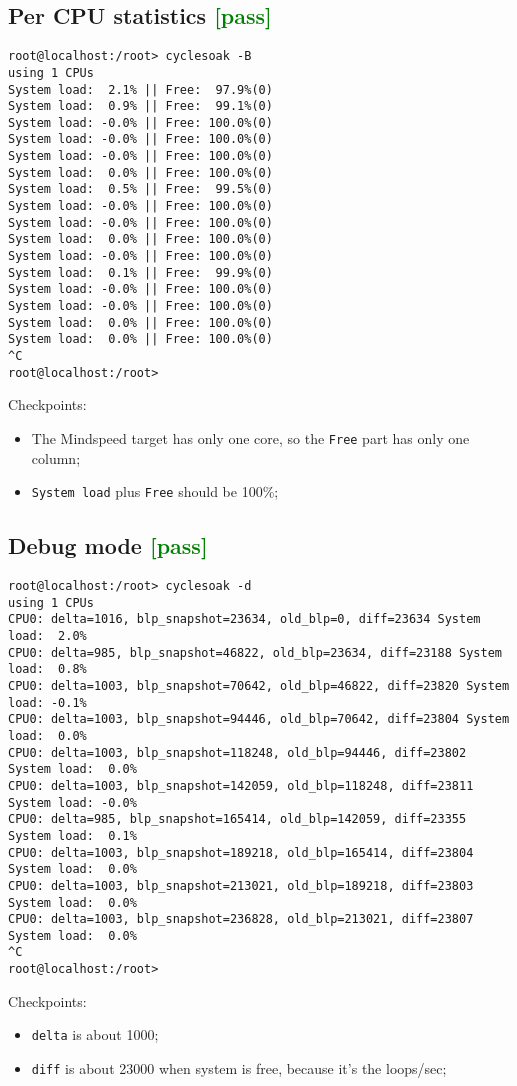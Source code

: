 \documentclass[a4paper]{report}
\begin{document}
\subsection{Per CPU statistics \textcolor{green}{[pass]}}
\begin{lstlisting}
root@localhost:/root> cyclesoak -B
using 1 CPUs
System load:  2.1% || Free:  97.9%(0)
System load:  0.9% || Free:  99.1%(0)
System load: -0.0% || Free: 100.0%(0)
System load: -0.0% || Free: 100.0%(0)
System load: -0.0% || Free: 100.0%(0)
System load:  0.0% || Free: 100.0%(0)
System load:  0.5% || Free:  99.5%(0)
System load: -0.0% || Free: 100.0%(0)
System load: -0.0% || Free: 100.0%(0)
System load:  0.0% || Free: 100.0%(0)
System load: -0.0% || Free: 100.0%(0)
System load:  0.1% || Free:  99.9%(0)
System load: -0.0% || Free: 100.0%(0)
System load: -0.0% || Free: 100.0%(0)
System load:  0.0% || Free: 100.0%(0)
System load:  0.0% || Free: 100.0%(0)
^C
root@localhost:/root> 
\end{lstlisting}
Checkpoints:
\begin{itemize}
    \item The Mindspeed target has only one core, so the {\tt Free} part has only one column;
    \item {\tt System load} plus {\tt Free} should be 100\%;
\end{itemize}
\subsection{Debug mode \textcolor{green}{[pass]}}
\begin{lstlisting}
root@localhost:/root> cyclesoak -d     
using 1 CPUs
CPU0: delta=1016, blp_snapshot=23634, old_blp=0, diff=23634 System load:  2.0%
CPU0: delta=985, blp_snapshot=46822, old_blp=23634, diff=23188 System load:  0.8%
CPU0: delta=1003, blp_snapshot=70642, old_blp=46822, diff=23820 System load: -0.1%
CPU0: delta=1003, blp_snapshot=94446, old_blp=70642, diff=23804 System load:  0.0%
CPU0: delta=1003, blp_snapshot=118248, old_blp=94446, diff=23802 System load:  0.0%
CPU0: delta=1003, blp_snapshot=142059, old_blp=118248, diff=23811 System load: -0.0%
CPU0: delta=985, blp_snapshot=165414, old_blp=142059, diff=23355 System load:  0.1%
CPU0: delta=1003, blp_snapshot=189218, old_blp=165414, diff=23804 System load:  0.0%
CPU0: delta=1003, blp_snapshot=213021, old_blp=189218, diff=23803 System load:  0.0%
CPU0: delta=1003, blp_snapshot=236828, old_blp=213021, diff=23807 System load:  0.0%
^C
root@localhost:/root> 
\end{lstlisting}
Checkpoints:
\begin{itemize}
    \item {\tt delta} is about 1000;
    \item {\tt diff} is about 23000 when system is free, because it's the loops/sec;
\end{itemize}
\end{document}
